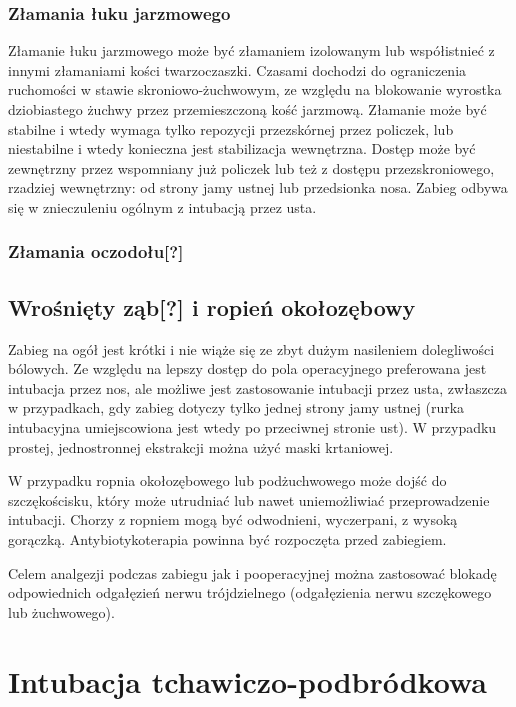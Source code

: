 \documentclass[a4paper, 12pt]{report}
\begin{document}
\subsection{Złamania łuku jarzmowego}

Złamanie łuku jarzmowego może być złamaniem izolowanym lub
współistnieć z innymi złamaniami kości twarzoczaszki. Czasami dochodzi
do ograniczenia ruchomości w stawie skroniowo-żuchwowym, ze względu na
blokowanie wyrostka dziobiastego żuchwy przez przemieszczoną kość
jarzmową. Złamanie może być stabilne i wtedy wymaga tylko repozycji
przezskórnej przez policzek, lub niestabilne i wtedy konieczna jest
stabilizacja wewnętrzna. Dostęp może być zewnętrzny przez wspomniany
już policzek lub też z dostępu przezskroniowego, rzadziej wewnętrzny:
od strony jamy ustnej lub przedsionka nosa.  Zabieg odbywa się w
znieczuleniu ogólnym z intubacją przez usta.

\subsection{Złamania oczodołu[?]}


\section{Wrośnięty ząb[?] i ropień okołozębowy}

Zabieg na ogół jest krótki i nie wiąże się ze zbyt dużym nasileniem
dolegliwości bólowych. Ze względu na lepszy dostęp do pola
operacyjnego preferowana jest intubacja przez nos, ale możliwe jest
zastosowanie intubacji przez usta, zwłaszcza w przypadkach, gdy zabieg
dotyczy tylko jednej strony jamy ustnej (rurka intubacyjna
umiejscowiona jest wtedy po przeciwnej stronie ust). W przypadku
prostej, jednostronnej ekstrakcji można użyć maski krtaniowej.

W przypadku ropnia okołozębowego lub podżuchwowego może dojść do
szczękościsku, który może utrudniać lub nawet uniemożliwiać
przeprowadzenie intubacji. Chorzy z ropniem mogą być odwodnieni,
wyczerpani, z wysoką gorączką. Antybiotykoterapia powinna być
rozpoczęta przed zabiegiem.

Celem analgezji podczas zabiegu jak i pooperacyjnej można zastosować
blokadę odpowiednich odgałęzień nerwu trójdzielnego (odgałęzienia
nerwu szczękowego lub żuchwowego).

\chapter{Intubacja tchawiczo-podbródkowa}
\end{document}
